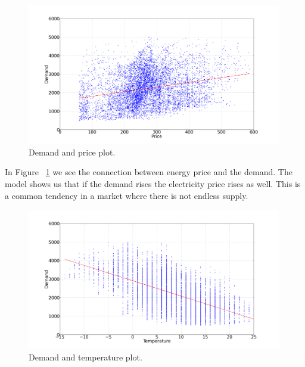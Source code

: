 \begin{figure}[H]
\centering
\includegraphics[width=0.99\textwidth ]{billeder/energy_price_plots/consump_price.png}
\caption{Demand and price plot.}
\label{fig:consump_price}
\end{figure}

In Figure ~\ref{fig:consump_price} we see the connection between energy price and the demand. The model shows us that if the demand rises the electricity price rises as well. This is a common tendency in a market where there is not endless supply.

\begin{figure}[H]
\centering
\includegraphics[width=0.99\textwidth ]{billeder/energy_price_plots/consump_temp.png}
\caption{Demand and temperature plot.}
\label{fig:consump_temp}
\end{figure}

